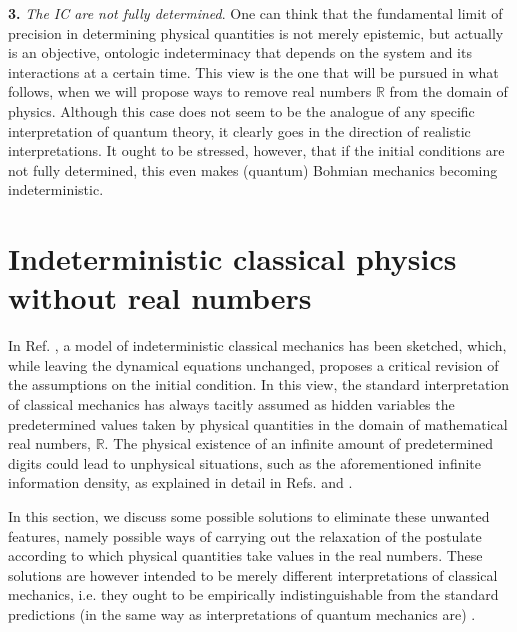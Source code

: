 \documentclass[12pt]{article}
\newcommand{\R}{\mathbb{R}}
\begin{document}
\textbf{3.} \emph{The IC \emph{are} not fully determined}. One can think that the fundamental limit of precision in determining physical quantities is not merely epistemic, but actually is an objective, ontologic indeterminacy that depends on the system and its interactions at a certain time. This view is the one that will be pursued in what follows, when we will propose ways to remove real numbers $\R$ from the domain of physics. Although this case does not seem to be the analogue of any specific interpretation of quantum theory, it clearly goes in the direction of realistic interpretations. It ought to be stressed, however, that if the initial conditions are not fully determined, this even makes (quantum) Bohmian mechanics becoming indeterministic. 




\section{Indeterministic classical physics without real numbers}
In Ref.  \cite{gisin1}, a model of indeterministic classical mechanics has been sketched, which, while leaving  the dynamical equations unchanged, proposes a critical revision of the assumptions on the initial condition. In this view, the standard interpretation of classical mechanics has always tacitly assumed as  hidden variables the predetermined values taken by physical quantities in the domain of mathematical real numbers,  $\R $.  The physical existence of an infinite amount of predetermined digits could lead to  unphysical situations, such as the aforementioned  infinite information density, as explained in detail in Refs. \cite{dowek} and \cite{gisin1}.

In this section, we discuss some possible solutions to eliminate these unwanted features, namely possible ways of carrying out the relaxation of the postulate according to which physical quantities take values in the real numbers. These solutions are however intended to be merely different interpretations of classical mechanics, i.e. they ought to be empirically indistinguishable from the standard predictions (in the same way as interpretations of quantum mechanics are) \cite{baumann}.
\end{document}

